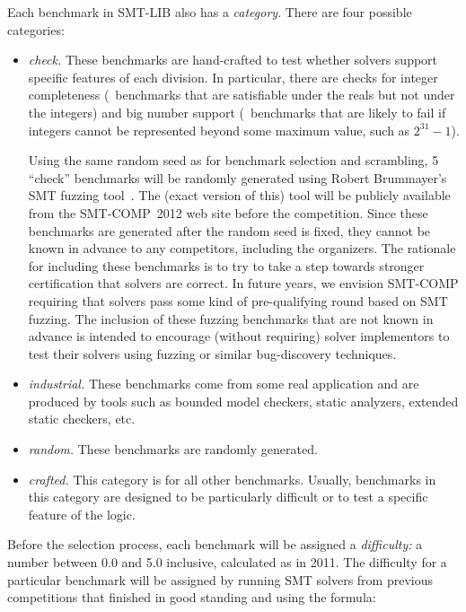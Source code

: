 \documentclass[12pt]{article}
\begin{document}
Each benchmark in SMT-LIB also has a \emph{category}.  There are four possible
categories:
%
\begin{itemize}
\item \emph{check.} These benchmarks are hand-crafted to test whether
  solvers support specific features of each division.  In particular,
  there are checks for integer completeness (\ie\ benchmarks that are
  satisfiable under the reals but not under the integers) and big
  number support (\ie\ benchmarks that are likely to fail if integers
  cannot be represented beyond some maximum value, such as
  $2^{31}-1$).

  \noindent%
  Using the same random seed as
  for benchmark selection and scrambling, 5 ``check'' benchmarks will
  be randomly generated using Robert Brummayer's SMT fuzzing
  tool~\cite{brummayer+09}.  The (exact version of this) tool will be
  publicly available from the SMT-COMP~2012 web site before the
  competition.  Since these benchmarks are generated after the random
  seed is fixed, they cannot be known in advance to any competitors,
  including the organizers.  The rationale for including these
  benchmarks is to try to take a step towards stronger certification
  that solvers are correct.  In future years, we envision SMT-COMP
  requiring that solvers pass some kind of pre-qualifying round based
  on SMT fuzzing.  The inclusion of these fuzzing benchmarks that are
  not known in advance is intended to encourage (without requiring)
  solver implementors to test their solvers using fuzzing or similar
  bug-discovery techniques.
\item \emph{industrial.} These benchmarks come from some real application
      and are produced by tools such as bounded model checkers, static analyzers, extended
      static checkers, etc.
\item \emph{random.} These benchmarks are randomly generated.
\item \emph{crafted.} This category is for all other benchmarks.  Usually,
  benchmarks in this category are designed to be particularly difficult or to
  test a specific feature of the logic.
\end{itemize}

Before the selection process, each benchmark will be assigned a
\emph{difficulty:} a number between 0.0 and 5.0 inclusive, calculated as in 2011.  The
difficulty for a particular benchmark will be assigned by running SMT
solvers from previous competitions that finished in good
standing and using the formula:
\end{document}
